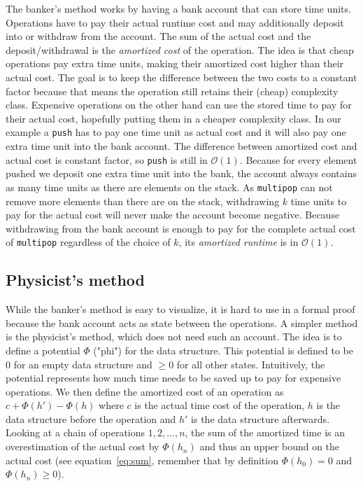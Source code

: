 \documentclass[sigplan,screen,review,anonymous]{acmart}
\renewcommand\O[1]{$\mathcal{O}(#1)$}
\begin{document}
The banker's method works by having a bank account that can store time units. Operations have to pay their actual runtime cost and may additionally deposit into or withdraw from the account. The sum of the actual cost and the deposit/withdrawal is the \textit{amortized cost} of the operation. The idea is that cheap operations pay extra time units, making their amortized cost higher than their actual cost. The goal is to keep the difference between the two costs to a constant factor because that means the operation still retains their (cheap) complexity class. Expensive operations on the other hand can use the stored time to pay for their actual cost, hopefully putting them in a cheaper complexity class. In our example a \texttt{push} has to pay one time unit as actual cost and it will also pay one extra time unit into the bank account. The difference between amortized cost and actual cost is constant factor, so \texttt{push} is still in \O{1}. Because for every element pushed we deposit one extra time unit into the bank, the account always contains as many time units as there are elements on the stack. As \texttt{multipop} can not remove more elements than there are on the stack, withdrawing $k$ time units to pay for the actual cost will never make the account become negative. Because withdrawing from the bank account is enough to pay for the complete actual cost of \texttt{multipop} regardless of the choice of $k$, its \textit{amortized runtime} is in \O{1}.

\subsection{Physicist's method}\label{sec:physicist}

While the banker's method is easy to visualize, it is hard to use in a formal proof because the bank account acts as state between the operations. A simpler method is the physicist's method, which does not need such an account. The idea is to define a potential $\Phi$ ("phi") for the data structure. This potential is defined to be $0$ for an empty data structure and $\ge 0$ for all other states. Intuitively, the potential represents how much time needs to be saved up to pay for expensive operations. We then define the amortized cost of an operation as $c + \Phi(h') - \Phi(h)$ where $c$ is the actual time cost of the operation, $h$ is the data structure before the operation and $h'$ is the data structure afterwards. Looking at a chain of operations $1, 2, ..., n$, the sum of the amortized time is an overestimation of the actual cost by $\Phi(h_n)$ and thus an upper bound on the actual cost (see equation~\ref{eq:sum}, remember that by definition $\Phi(h_0) = 0$ and $\Phi(h_n) \ge 0$).
\end{document}
